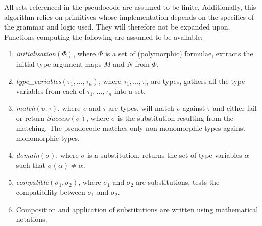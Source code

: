 \documentclass[]{ceurart}
\begin{document}
All sets referenced in the pseudocode are assumed to be finite. Additionally, this algorithm relies on primitives whose implementation depends on the specifics of the grammar and logic used. They will therefore not be expanded upon. Functions computing the following are assumed to be available: 
\begin{enumerate}
   \item[\labelitemi] \emph{initialisation\((\Phi)\)}, where \(\Phi\) is a set of (polymorphic) formulae, extracts the initial type argument maps \(M\) and \(N\) from \(\Phi\).
   \item[\labelitemi] \emph{type\_variables\((\tau_1, \dots, \tau_n)\)}, where \(\tau_1, \dots,\tau_n\) are types, gathers all the type variables from each of \(\tau_1, \dots, \tau_n\) into a set.
   \item[\labelitemi] \emph{match\((\upsilon, \tau)\)}, where \(\upsilon\) and \(\tau\) are types, will match \(\upsilon\) against \(\tau\) and either fail or return \emph{Success\((\sigma)\)}, where \(\sigma\) is the substitution resulting from the matching. The pseudocode matches only non-monomorphic types against monomorphic types.
   \item[\labelitemi] \emph{domain\((\sigma)\)}, where \(\sigma\) is a substitution, returns the set of type variables \(\alpha\) such that \(\sigma(
   \alpha) \not= \alpha\).
   \item[\labelitemi] \emph{compatible\((\sigma_1, \sigma_2)\)}, where \(\sigma_1\) and \(\sigma_2\) are substitutions, tests the compatibility between \(\sigma_1\) and \(\sigma_2\).
   \item[\labelitemi] Composition and application of substitutions are written using mathematical notations.
\end{enumerate}
\end{document}
